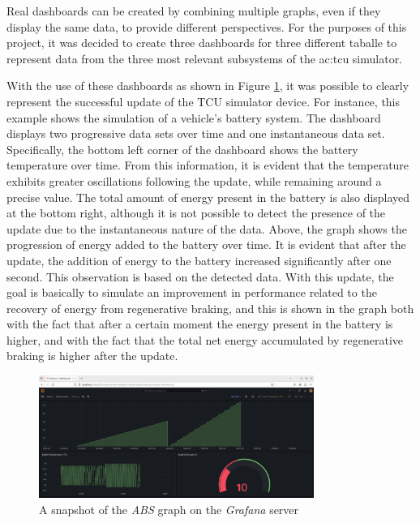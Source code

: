 Real dashboards can be created by combining multiple graphs, even if they display the same data, to provide different perspectives. For the purposes of this project, it was decided to create three dashboards for three different taballe to represent data from the three most relevant subsystems of the \gls{ac:tcu} simulator. 

With the use of these dashboards as shown in Figure \ref{fig:GrafanaABS}, it was possible to clearly represent the successful update of the TCU simulator device. For instance, this example shows the simulation of a vehicle's battery system. The dashboard displays two progressive data sets over time and one instantaneous data set. Specifically, the bottom left corner of the dashboard shows the battery temperature over time. From this information, it is evident that the temperature exhibits greater oscillations following the update, while remaining around a precise value. The total amount of energy present in the battery is also displayed at the bottom right, although it is not possible to detect the presence of the update due to the instantaneous nature of the data. Above, the graph shows the progression of energy added to the battery over time. It is evident that after the update, the addition of energy to the battery increased significantly after one second. This observation is based on the detected data. With this update, the goal is basically to simulate an improvement in performance related to the recovery of energy from regenerative braking, and this is shown in the graph both with the fact that after a certain moment the energy present in the battery is higher, and with the fact that the total net energy accumulated by regenerative braking is higher after the update.
\begin{figure}[h]  %
    \centering
    \includegraphics[width=0.8\textwidth]{images/grafana_Battery.png}  %
    \caption{A snapshot of the \textit{ABS} graph on the \textit{Grafana} server}
    \label{fig:GrafanaABS}
\end{figure}

